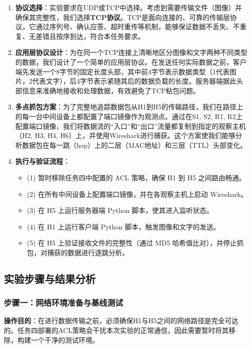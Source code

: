 \documentclass[12pt, a4paper]{article}
\begin{document}
\begin{enumerate}
    \item \textbf{协议选择}：实验要求在UDP或TCP中选择。考虑到需要传输文件（图像）并确保其完整性，我们选择\textbf{TCP协议}。TCP是面向连接的、可靠的传输层协议，它通过序列号、确认应答、超时重传等机制，能够保证数据不丢失、不重复、无差错且按序到达，符合本任务要求。
    \item \textbf{应用层协议设计}：为在同一个TCP连接上清晰地区分图像和文字两种不同类型的数据，我们设计了一个简单的应用层协议。在发送任何实际数据之前，客户端先发送一个8字节的固定长度头部，其中前4字节表示数据类型（1代表图片，2代表文字），后4字节表示紧随其后的数据负载的长度。服务器端据此头部信息来准确地接收和处理数据，有效避免了TCP粘包问题。
    \item \textbf{多点抓包方案}：为了完整地追踪数据包从H1到H5的传输路径，我们在路径上的每一台中间设备上都配置了端口镜像作为观测点。通过在S1, S2, R1, R2上配置端口镜像，我们将数据流的“入口”和“出口”流量都复制到指定的观察主机（H2, H3, H4, H6）上，并使用Wireshark进行捕获。这个方案使我们能够分析数据包在每一跳（hop）上的二层（MAC地址）和三层（TTL）头部变化。
    \item \textbf{执行与验证流程}：
    \begin{itemize}
        \item (1) 暂时移除任务四中配置的 ACL 策略，确保 H1 到 H5 之间路由畅通。
        \item (2) 在所有中间设备上配置端口镜像，并在各观察主机上启动 Wireshark。
        \item (3) 在 H5 上运行服务器端 Python 脚本，使其进入监听状态。
        \item (4) 在 H1 上运行客户端 Python 脚本，触发图像和文字的发送。
        \item (5) 在 H5 上验证接收文件的完整性（通过 MD5 哈希值比对），并停止抓包，对捕获的数据进行逐跳分析。
    \end{itemize}
\end{enumerate}

\subsection{实验步骤与结果分析}

\subsubsection{步骤一：网络环境准备与基线测试}

\textbf{操作目的}：在进行数据传输之前，必须确保H1与H5之间的网络路径是完全可达的。任务四部署的ACL策略会干扰本次实验的正常通信，因此需要暂时将其移除，构建一个干净的测试环境。
\end{document}
